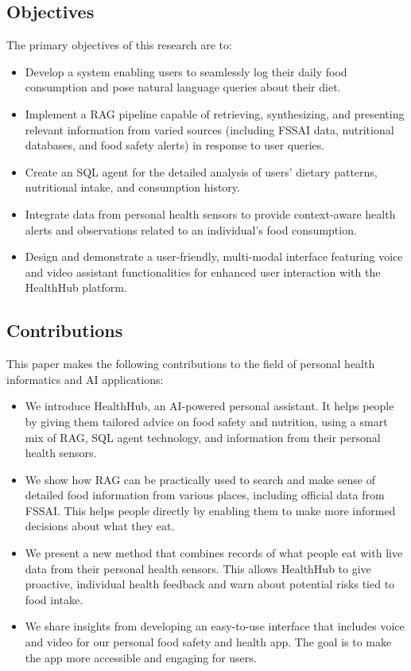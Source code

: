 \subsection{Objectives}
The primary objectives of this research are to:
\begin{itemize}[noitemsep, topsep=0pt]
    \item Develop a system enabling users to seamlessly log their daily food consumption and pose natural language queries about their diet.
    \item Implement a RAG pipeline capable of retrieving, synthesizing, and presenting relevant information from varied sources (including FSSAI data, nutritional databases, and food safety alerts) in response to user queries.
    \item Create an SQL agent for the detailed analysis of users' dietary patterns, nutritional intake, and consumption history.
    \item Integrate data from personal health sensors to provide context-aware health alerts and observations related to an individual's food consumption.
    \item Design and demonstrate a user-friendly, multi-modal interface featuring voice and video assistant functionalities for enhanced user interaction with the HealthHub platform.
\end{itemize}

\subsection{Contributions}
This paper makes the following contributions to the field of personal health informatics and AI applications:
\begin{itemize}[noitemsep, topsep=0pt]
    \item We introduce HealthHub, an AI-powered personal assistant. It helps people by giving them tailored advice on food safety and nutrition, using a smart mix of RAG, SQL agent technology, and information from their personal health sensors.
    \item We show how RAG can be practically used to search and make sense of detailed food information from various places, including official data from FSSAI. This helps people directly by enabling them to make more informed decisions about what they eat.
    \item We present a new method that combines records of what people eat with live data from their personal health sensors. This allows HealthHub to give proactive, individual health feedback and warn about potential risks tied to food intake.
    \item We share insights from developing an easy-to-use interface that includes voice and video for our personal food safety and health app. The goal is to make the app more accessible and engaging for users.
\end{itemize}

